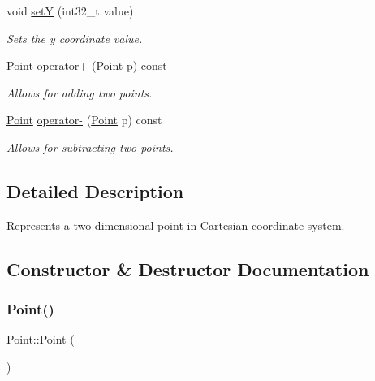 \begin{DoxyCompactItemize}
void \mbox{\hyperlink{struct_point_a7f258294987a7e2640a12f4d41253375}{setY}} (int32\+\_\+t value)
\begin{DoxyCompactList}\small\item\em Sets the y coordinate value. \end{DoxyCompactList}\item 
\mbox{\hyperlink{struct_point}{Point}} \mbox{\hyperlink{struct_point_a8629d3083ed756bbf84fbbd7f4b0781a}{operator+}} (\mbox{\hyperlink{struct_point}{Point}} p) const
\begin{DoxyCompactList}\small\item\em Allows for adding two points. \end{DoxyCompactList}\item 
\mbox{\hyperlink{struct_point}{Point}} \mbox{\hyperlink{struct_point_a21c4b2d6af14c97a276931a912413bef}{operator-\/}} (\mbox{\hyperlink{struct_point}{Point}} p) const
\begin{DoxyCompactList}\small\item\em Allows for subtracting two points. \end{DoxyCompactList}\end{DoxyCompactItemize}


\subsection{Detailed Description}
Represents a two dimensional point in Cartesian coordinate system. 



\subsection{Constructor \& Destructor Documentation}
\mbox{\label{struct_point_ad92f2337b839a94ce97dcdb439b4325a}} 
\subsubsection{\texorpdfstring{Point()}{Point()}\hspace{0.1cm}{\footnotesize\ttfamily [1/2]}}
{\footnotesize\ttfamily Point\+::\+Point (\begin{DoxyParamCaption}{ }\end{DoxyParamCaption})\hspace{0.3cm}{\ttfamily [inline]}}



